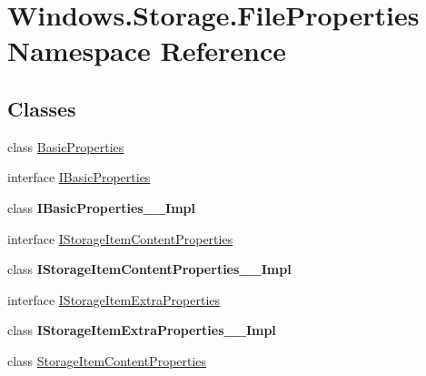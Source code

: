\hypertarget{namespace_windows_1_1_storage_1_1_file_properties}{}\section{Windows.\+Storage.\+File\+Properties Namespace Reference}
\label{namespace_windows_1_1_storage_1_1_file_properties}
\subsection*{Classes}
\begin{DoxyCompactItemize}
\item 
class \hyperlink{class_windows_1_1_storage_1_1_file_properties_1_1_basic_properties}{Basic\+Properties}
\item 
interface \hyperlink{interface_windows_1_1_storage_1_1_file_properties_1_1_i_basic_properties}{I\+Basic\+Properties}
\item 
class {\bfseries I\+Basic\+Properties\+\_\+\+\_\+\+Impl}
\item 
interface \hyperlink{interface_windows_1_1_storage_1_1_file_properties_1_1_i_storage_item_content_properties}{I\+Storage\+Item\+Content\+Properties}
\item 
class {\bfseries I\+Storage\+Item\+Content\+Properties\+\_\+\+\_\+\+Impl}
\item 
interface \hyperlink{interface_windows_1_1_storage_1_1_file_properties_1_1_i_storage_item_extra_properties}{I\+Storage\+Item\+Extra\+Properties}
\item 
class {\bfseries I\+Storage\+Item\+Extra\+Properties\+\_\+\+\_\+\+Impl}
\item 
class \hyperlink{class_windows_1_1_storage_1_1_file_properties_1_1_storage_item_content_properties}{Storage\+Item\+Content\+Properties}
\end{DoxyCompactItemize}
